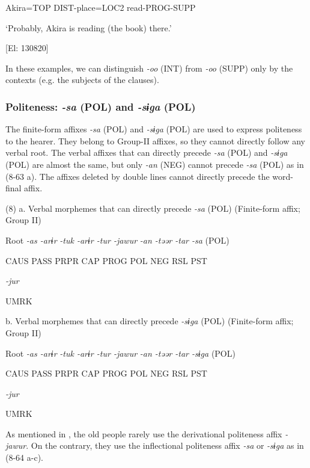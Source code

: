       Akira=TOP  DIST-place=LOC2  read-PROG-SUPP

      ‘Probably, Akira is reading (the book) there.’

      [El: 130820]

In these examples, we can distinguish \textit{{}-oo} (INT) from \textit{{}-oo} (SUPP) only by the contexts (e.g. the subjects of the clauses).

\subsubsection{Politeness: \textit{{}-sa} (POL) and \textit{{}-sɨga} (POL)}

The finite-form affixes \textit{{}-sa} (POL) and \textit{{}-sɨga} (POL) are used to express politeness to the hearer. They belong to Group-II affixes, so they cannot directly follow any verbal root. The verbal affixes that can directly precede \textit{{}-sa} (POL) and \textit{{}-sɨga} (POL) are almost the same, but only \textit{{}-an} (NEG) cannot precede \textit{{}-sa} (POL) as in (8-63 a). The affixes deleted by double lines cannot directly precede the word-final affix.

(8)  a. Verbal morphemes that can directly precede \textit{{}-sa} (POL) (Finite-form affix; Group II)

  Root  \textit{{}-as  {}-arɨr} %
\textit{{}-tuk  {}-arɨr  {}-tur  {}-jawur} %
\textit{{}-an  {}-təər  {}-tar  {}-sa} (POL)

    CAUS  PASS  PRPR  CAP  PROG  POL  NEG  RSL  PST  

          \textit{{}-jur} 

          UMRK    

  b. Verbal morphemes that can directly precede \textit{{}-sɨga} (POL) (Finite-form affix; Group II)

  Root  \textit{{}-as  {}-arɨr} %
\textit{{}-tuk  {}-arɨr  {}-tur  {}-jawur} %
\textit{{}-an  {}-təər  {}-tar  {}-sɨga} (POL)

    CAUS  PASS  PRPR  CAP  PROG  POL  NEG  RSL  PST  

          \textit{{}-jur} 

          UMRK    

As mentioned in , the old people rarely use the derivational politeness affix \textit{{}-jawur}. On the contrary, they use the inflectional politeness affix \textit{{}-sa} or \textit{{}-sɨga} as in (8-64 a-c).

